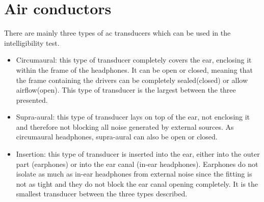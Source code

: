 \section{Air conductors}
\label{sec:aircon}
There are mainly three types of \gls{ac} transducers which can be used in the intelligibility test.  %
\begin{itemize}
\item Circumaural: this type of transducer completely covers the ear, enclosing it within the frame of the headphones. It can be open or closed, meaning that the frame containing the drivers can be completely sealed(closed) or allow airflow(open). This type of transducer is the largest between the three presented.
\item Supra-aural:  this type of transducer lays on top of the ear, not enclosing it and therefore not blocking all noise generated by external sources. As circumaural headphones, supra-aural can also be open or closed.
\item Insertion: this type of transducer is inserted into the ear, either into the outer part (earphones) or into the ear canal (in-ear headphones). Earphones do not isolate as much as in-ear headphones from external noise since the fitting is not as tight and they do not block the ear canal opening completely. It is the smallest transducer between the three types described.
\end{itemize}
